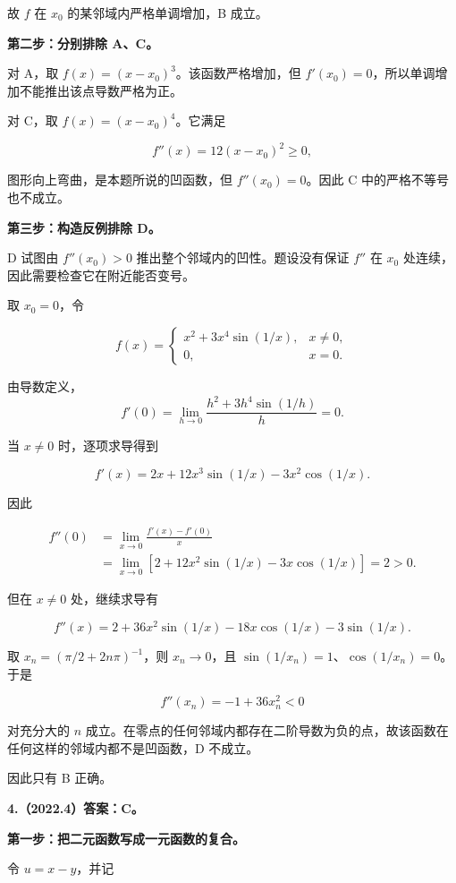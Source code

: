 \documentclass[UTF8,11pt,fontset=windows]{ctexart}
\begin{document}
故 $f$ 在 $x_0$ 的某邻域内严格单调增加，B 成立。

\textbf{第二步：分别排除 A、C。}

对 A，取 $f(x)=(x-x_0)^3$。该函数严格增加，但 $f'(x_0)=0$，所以单调增加不能推出该点导数严格为正。

对 C，取 $f(x)=(x-x_0)^4$。它满足

$$
f''(x)=12(x-x_0)^2\ge0,
$$

图形向上弯曲，是本题所说的凹函数，但 $f''(x_0)=0$。因此 C 中的严格不等号也不成立。

\textbf{第三步：构造反例排除 D。}

D 试图由 $f''(x_0)>0$ 推出整个邻域内的凹性。题设没有保证 $f''$ 在 $x_0$ 处连续，因此需要检查它在附近能否变号。

取 $x_0=0$，令

$$
f(x)=\begin{cases}x^2+3x^4\sin(1/x),&x\ne0,\\0,&x=0.\end{cases}
$$

由导数定义，
$$
f'(0)=\lim_{h\to0}\frac{h^2+3h^4\sin(1/h)}h=0.
$$

当 $x\ne0$ 时，逐项求导得到

$$
f'(x)=2x+12x^3\sin(1/x)-3x^2\cos(1/x).
$$

因此

$$
\begin{aligned}
f''(0)
&=\lim_{x\to0}\frac{f'(x)-f'(0)}x\\
&=\lim_{x\to0}\left[2+12x^2\sin(1/x)-3x\cos(1/x)\right]=2>0.
\end{aligned}
$$

但在 $x\ne0$ 处，继续求导有

$$
f''(x)=2+36x^2\sin(1/x)-18x\cos(1/x)-3\sin(1/x).
$$

取 $x_n=(\pi/2+2n\pi)^{-1}$，则 $x_n\to0$，且 $\sin(1/x_n)=1$、$\cos(1/x_n)=0$。于是

$$
f''(x_n)=-1+36x_n^2<0
$$

对充分大的 $n$ 成立。在零点的任何邻域内都存在二阶导数为负的点，故该函数在任何这样的邻域内都不是凹函数，D 不成立。

因此只有 B 正确。

\clearpage

\textbf{4.（2022.4）答案：C。}

\textbf{第一步：把二元函数写成一元函数的复合。}

令 $u=x-y$，并记
\end{document}
